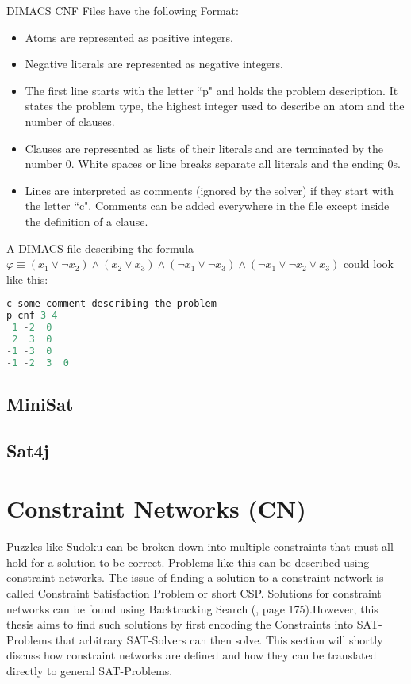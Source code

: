DIMACS CNF Files have the following Format:
\begin{itemize}
    \item Atoms are represented as positive integers.
    \item Negative literals are represented as negative integers.
    \item The first line starts with the letter ``p" and holds the problem description. It states the problem type, the highest integer used to describe an atom and the number of clauses.
    \item Clauses are represented as lists of their literals and are terminated by the number 0. White spaces or line breaks separate all literals and the ending 0s.
    \item Lines are interpreted as comments (ignored by the solver) if they start with the letter ``c". Comments can be added everywhere in the file except inside the definition of a clause.
\end{itemize}
A DIMACS file describing the formula $\varphi \equiv (x_1 \lor \neg x_2) \land (x_2 \lor x_3) \land (\neg x_1 \lor \neg x_3) \land (\neg x_1 \lor \neg x_2 \lor x_3)$ could look like this:

\lstset{basicstyle=\ttfamily}
\begin{lstlisting}[language=Java,frame=single]
c some comment describing the problem
p cnf 3 4
 1 -2  0
 2  3  0
-1 -3  0
-1 -2  3  0
\end{lstlisting}

\subsection{MiniSat} 	
\lipsum[1]

\subsection{Sat4j} 	
\lipsum[1]

\section{Constraint Networks (CN)}
Puzzles like Sudoku can be broken down into multiple constraints that must all hold for a solution to be correct. Problems like this can be described using constraint networks. The issue of finding a solution to a constraint network is called Constraint Satisfaction Problem or short CSP. Solutions for constraint networks can be found using Backtracking Search (\cite{ArtificialAModernApproach}, page 175).However, this thesis aims to find such solutions by first encoding the Constraints into SAT-Problems that arbitrary SAT-Solvers can then solve. This section will shortly discuss how constraint networks are defined and how they can be translated directly to general SAT-Problems.


